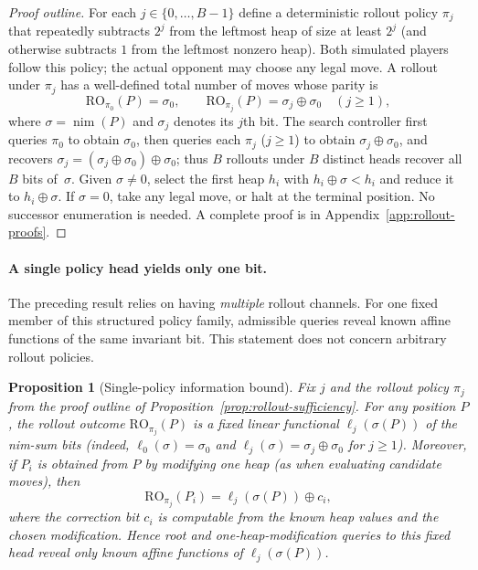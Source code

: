 \documentclass[11pt]{article}
\theoremstyle{plain}
\newtheorem{proposition}[theorem]{Proposition}
\theoremstyle{definition}
\theoremstyle{remark}
\numberwithin{equation}{section}
\begin{document}
\begin{proof}[Proof outline]
For each $j\in\{0,\dots,B-1\}$ define a deterministic rollout policy $\pi_j$ that repeatedly subtracts $2^j$ from the leftmost heap of size at least $2^j$ (and otherwise subtracts $1$ from the leftmost nonzero heap). Both simulated players follow this policy; the actual opponent may choose any legal move.
A rollout under $\pi_j$ has a well-defined total number of moves whose parity is
\[
\mathrm{RO}_{\pi_0}(P)=\sigma_0,\qquad
\mathrm{RO}_{\pi_j}(P)=\sigma_j\oplus\sigma_0\quad(j\ge 1),
\]
where $\sigma=\operatorname{nim}(P)$ and $\sigma_j$ denotes its $j$th bit.
The search controller first queries $\pi_0$ to obtain $\sigma_0$, then queries each $\pi_j$ ($j\ge 1$) to obtain $\sigma_j\oplus\sigma_0$, and recovers $\sigma_j = (\sigma_j\oplus\sigma_0)\oplus\sigma_0$; thus $B$ rollouts under $B$ distinct heads recover all $B$ bits of~$\sigma$.
Given $\sigma\ne0$, select the first heap $h_i$ with $h_i\oplus\sigma<h_i$ and reduce it to $h_i\oplus\sigma$. If $\sigma=0$, take any legal move, or halt at the terminal position. No successor enumeration is needed.
A complete proof is in Appendix~\ref{app:rollout-proofs}.
\end{proof}

\paragraph{A single policy head yields only one bit.}
The preceding result relies on having \emph{multiple} rollout channels.
For one fixed member of this structured policy family, admissible queries reveal known affine functions of the same invariant bit. This statement does not concern arbitrary rollout policies.

\begin{proposition}[Single-policy information bound]
\label{prop:single-policy-bound}
Fix $j$ and the rollout policy $\pi_j$ from the proof outline of Proposition~\ref{prop:rollout-sufficiency}.
For any position $P$, the rollout outcome $\mathrm{RO}_{\pi_j}(P)$ is a fixed linear functional $\ell_j(\sigma(P))$ of the nim-sum bits (indeed, $\ell_0(\sigma)=\sigma_0$ and $\ell_j(\sigma)=\sigma_j\oplus\sigma_0$ for $j\ge 1$).
Moreover, if $P_i$ is obtained from $P$ by modifying one heap (as when evaluating candidate moves), then
\[
\mathrm{RO}_{\pi_j}(P_i)=\ell_j(\sigma(P))\oplus c_i,
\]
where the correction bit $c_i$ is computable from the known heap values and the chosen modification.
Hence root and one-heap-modification queries to this fixed head reveal only known affine functions of $\ell_j(\sigma(P))$.
\end{proposition}
\end{document}
